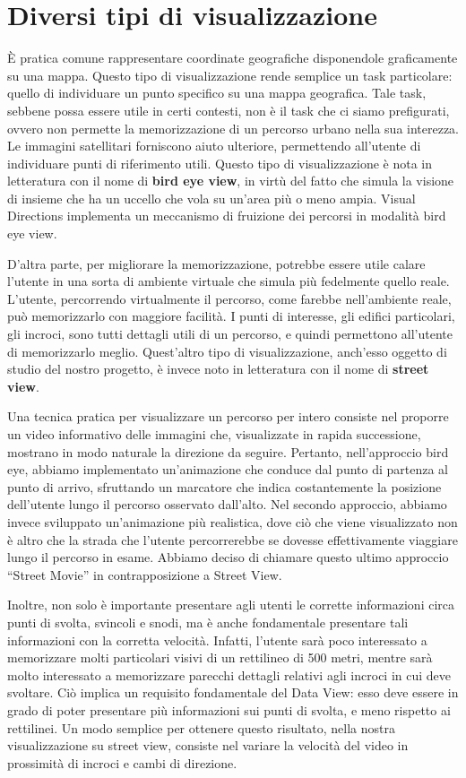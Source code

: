 \documentclass[12pt,a4paper,openright, notitlepage]{report}
\begin{document}
\section{Diversi tipi di visualizzazione}

È pratica comune rappresentare coordinate geografiche disponendole graficamente su una mappa. Questo tipo di visualizzazione rende semplice un task particolare: quello di individuare un punto specifico su una mappa geografica. Tale task, sebbene possa essere utile in certi contesti, non è il task che ci siamo prefigurati, ovvero non permette la memorizzazione di un percorso urbano nella sua interezza. Le immagini satellitari forniscono aiuto ulteriore, permettendo all'utente di individuare punti di riferimento utili. Questo tipo di visualizzazione è nota in letteratura con il nome di \textbf{bird eye view}, in virtù del fatto che simula la visione di insieme che ha un uccello che vola su un’area più o meno ampia. Visual Directions implementa un meccanismo di fruizione dei percorsi in modalità bird eye view.

D'altra parte, per migliorare la memorizzazione, potrebbe essere utile calare l'utente in una sorta di ambiente virtuale che simula più fedelmente quello reale. L'utente, percorrendo virtualmente il percorso, come farebbe nell'ambiente reale, può memorizzarlo con maggiore facilità. I punti di interesse, gli edifici particolari, gli incroci, sono tutti dettagli utili di un percorso, e quindi permettono all’utente di memorizzarlo meglio. Quest’altro tipo di visualizzazione, anch’esso oggetto di studio del nostro progetto, è invece noto in letteratura con il nome di \textbf{street view}.

Una tecnica pratica per visualizzare un percorso per intero consiste nel proporre un video informativo delle immagini che, visualizzate in rapida successione, mostrano in modo naturale la direzione da seguire. Pertanto, nell’approccio bird eye, abbiamo implementato un’animazione che conduce dal punto di partenza al punto di arrivo, sfruttando un marcatore che indica costantemente la posizione dell’utente lungo il percorso osservato dall’alto. Nel secondo approccio, abbiamo invece sviluppato un’animazione più realistica, dove ciò che viene visualizzato non è altro che la strada che l’utente percorrerebbe se dovesse effettivamente viaggiare lungo il percorso in esame. Abbiamo deciso di chiamare questo ultimo approccio ``Street Movie'' in contrapposizione a Street View. 

Inoltre, non solo è importante presentare agli utenti le corrette informazioni circa punti di svolta, svincoli e snodi, ma è anche fondamentale presentare tali informazioni con la corretta velocità. Infatti, l’utente sarà poco interessato a memorizzare molti particolari visivi di un rettilineo di 500 metri, mentre sarà molto interessato a memorizzare parecchi dettagli relativi agli incroci in cui deve svoltare. Ciò implica un requisito fondamentale del Data View: esso deve essere in grado di poter presentare più informazioni sui punti di svolta, e meno rispetto ai rettilinei. Un modo semplice per ottenere questo risultato, nella nostra visualizzazione su street view, consiste nel variare la velocità del video in prossimità di incroci e cambi di direzione.
\end{document}
